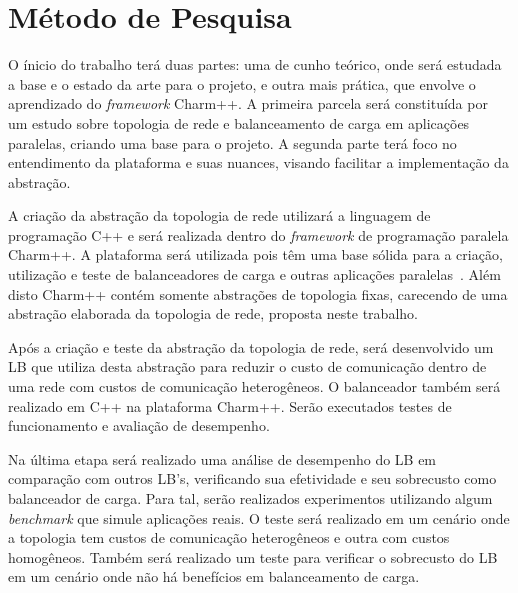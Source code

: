 \documentclass[
	12pt,				%
	openright,			%
	twoside,			%
	a4paper,			%
	english,			%
	brazil,				%
	]{abntex2}
\begin{document}
\section{Método de Pesquisa}
\label{sec:metodologia}

 
O ínicio do trabalho terá duas partes: uma de cunho teórico, onde será estudada a base e o estado da arte para o projeto, e outra mais prática, que envolve o aprendizado do \textit{framework} Charm++. A primeira parcela será constituída por um estudo sobre topologia de rede e balanceamento de carga em aplicações paralelas, criando uma base para o projeto. A segunda parte terá foco no entendimento da plataforma e suas nuances, visando facilitar a implementação da abstração.

A criação da abstração da topologia de rede utilizará a linguagem de programação C++ e será realizada dentro do \textit{framework} de programação paralela Charm++. A plataforma será utilizada pois têm uma base sólida para a criação, utilização e teste de balanceadores de carga e outras aplicações paralelas~\cite{pilla:CHARM}. Além disto Charm++ contém somente abstrações de topologia fixas, carecendo de uma abstração elaborada da topologia de rede, proposta neste trabalho.

Após a criação e teste da abstração da topologia de rede, será desenvolvido um LB que utiliza desta abstração para reduzir o custo de comunicação dentro de uma rede com custos de comunicação heterogêneos. O balanceador também será realizado em C++ na plataforma Charm++. Serão executados testes de funcionamento e avaliação de desempenho.

Na última etapa será realizado uma análise de desempenho do LB em comparação com outros LB's, verificando sua efetividade e seu sobrecusto como balanceador de carga. Para tal, serão realizados experimentos utilizando algum \textit{benchmark} que simule aplicações reais. O teste será realizado em um cenário onde a topologia tem custos de comunicação heterogêneos e outra com custos homogêneos. Também será realizado um teste para verificar o sobrecusto do LB em um cenário onde não há benefícios em balanceamento de carga.

\end{document}
